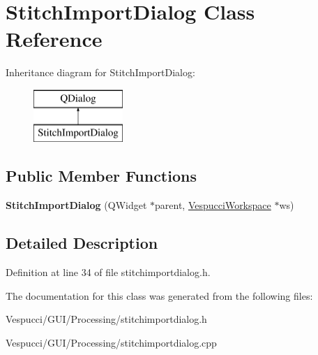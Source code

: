 \hypertarget{class_stitch_import_dialog}{}\section{Stitch\+Import\+Dialog Class Reference}
\label{class_stitch_import_dialog}
Inheritance diagram for Stitch\+Import\+Dialog\+:\begin{figure}[H]
\begin{center}
\leavevmode
\includegraphics[height=2.000000cm]{class_stitch_import_dialog}
\end{center}
\end{figure}
\subsection*{Public Member Functions}
\begin{DoxyCompactItemize}
\item 
{\bfseries Stitch\+Import\+Dialog} (Q\+Widget $\ast$parent, \hyperlink{class_vespucci_workspace}{Vespucci\+Workspace} $\ast$ws)\hypertarget{class_stitch_import_dialog_a2c076e2165070a7d80fd801d1d902af2}{}\label{class_stitch_import_dialog_a2c076e2165070a7d80fd801d1d902af2}

\end{DoxyCompactItemize}


\subsection{Detailed Description}


Definition at line 34 of file stitchimportdialog.\+h.



The documentation for this class was generated from the following files\+:\begin{DoxyCompactItemize}
\item 
Vespucci/\+G\+U\+I/\+Processing/stitchimportdialog.\+h\item 
Vespucci/\+G\+U\+I/\+Processing/stitchimportdialog.\+cpp\end{DoxyCompactItemize}
